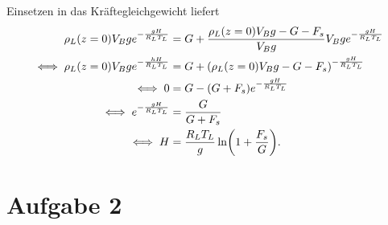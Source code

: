 \documentclass{exercise}
\begin{document}
\begin{enumerate}
\[        \]
        Einsetzen in das Kräftegleichgewicht liefert
        \begin{align*}
            \rho_L\parentheses*{z = 0}V_B ge^{-\frac{gH}{R_L T_L}} &= G + \frac{\rho_L\parentheses*{z = 0}V_B g - G - F_s}{V_B g}V_B ge^{-\frac{gH}{R_L T_L}}\\
            \iff \rho_L\parentheses*{z = 0}V_B ge^{-\frac{hH}{R_L T_L}} &= G + \parentheses*{\rho_L\parentheses*{z = 0}V_B g - G - F_s}^{-\frac{gH}{R_L T_L}}\\
            \iff 0 &= G - \parentheses*{G + F_s}e^{-\frac{gH}{R_L T_L}}\\
            \iff e^{-\frac{gH}{R_L T_L}} &= \frac{G}{G + F_s}\\
            \iff H &= \frac{R_L T_L}{g}\ln\parentheses*{1 + \frac{F_s}{G}}.
        \end{align*}
    \end{enumerate}


    \section*{Aufgabe 2}
    
\end{document}
